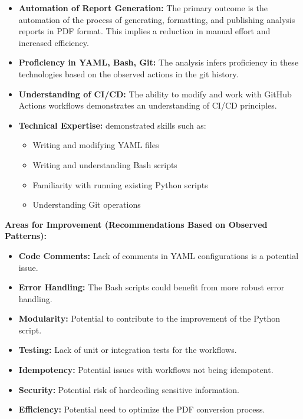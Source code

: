 \documentclass{article}
\begin{document}
\begin{itemize}
\begin{itemize}
        \begin{itemize}
            \item \textbf{Automation of Report Generation:}  The primary outcome is the automation of the process of generating, formatting, and publishing analysis reports in PDF format.  This implies a reduction in manual effort and increased efficiency.
            \item \textbf{Proficiency in YAML, Bash, Git:} The analysis infers proficiency in these technologies based on the observed actions in the git history.
            \item \textbf{Understanding of CI/CD:}  The ability to modify and work with GitHub Actions workflows demonstrates an understanding of CI/CD principles.
            \item \textbf{Technical Expertise:} demonstrated skills such as:
            \begin{itemize}
                \item Writing and modifying YAML files
                \item Writing and understanding Bash scripts
                \item Familiarity with running existing Python scripts
                \item Understanding Git operations
            \end{itemize}
        \end{itemize}

\textbf{Areas for Improvement (Recommendations Based on Observed Patterns):}

        \begin{itemize}
            \item \textbf{Code Comments:} Lack of comments in YAML configurations is a potential issue.
            \item \textbf{Error Handling:} The Bash scripts could benefit from more robust error handling.
            \item \textbf{Modularity:}  Potential to contribute to the improvement of the Python script.
            \item \textbf{Testing:}  Lack of unit or integration tests for the workflows.
            \item \textbf{Idempotency:}  Potential issues with workflows not being idempotent.
            \item \textbf{Security:}  Potential risk of hardcoding sensitive information.
            \item \textbf{Efficiency:}  Potential need to optimize the PDF conversion process.
        \end{itemize}


\end{itemize}
\end{itemize}
\end{document}
